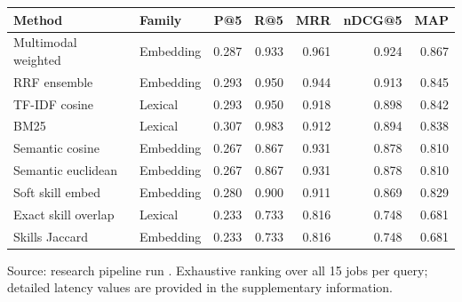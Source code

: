 \caption{Retrieval method comparison (macro-averaged, $K{=}5$).}
\label{tab:method-comparison}
\begin{tabular}{@{}llrrrrr@{}}
\toprule
Method & Family & P@5 & R@5 & MRR & nDCG@5 & MAP \\
\midrule
Multimodal weighted & Embedding & 0.287 & 0.933 & 0.961 & 0.924 & 0.867 \\
RRF ensemble & Embedding & 0.293 & 0.950 & 0.944 & 0.913 & 0.845 \\
TF-IDF cosine & Lexical & 0.293 & 0.950 & 0.918 & 0.898 & 0.842 \\
BM25 & Lexical & 0.307 & 0.983 & 0.912 & 0.894 & 0.838 \\
Semantic cosine & Embedding & 0.267 & 0.867 & 0.931 & 0.878 & 0.810 \\
Semantic euclidean & Embedding & 0.267 & 0.867 & 0.931 & 0.878 & 0.810 \\
Soft skill embed & Embedding & 0.280 & 0.900 & 0.911 & 0.869 & 0.829 \\
Exact skill overlap & Lexical & 0.233 & 0.733 & 0.816 & 0.748 & 0.681 \\
Skills Jaccard & Embedding & 0.233 & 0.733 & 0.816 & 0.748 & 0.681 \\
\bottomrule
\end{tabular}
\par\vspace{0.4em}
\footnotesize{Source: research pipeline run . Exhaustive ranking over all 15 jobs per query; detailed latency values are provided in the supplementary information.}
